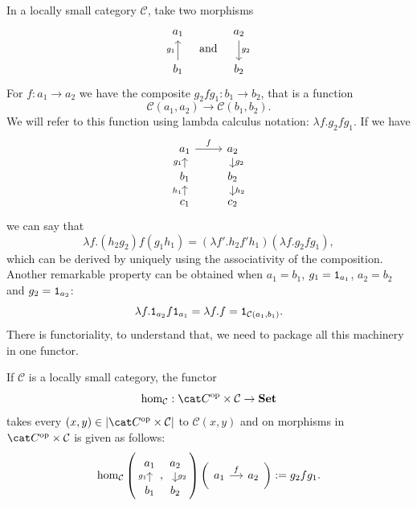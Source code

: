 In a locally small 
category \(\mathcal{C}\), take two morphisms
\[
  \begin{tikzcd}
    a_1 \\
    b_1 \ar["g_1", u]
  \end{tikzcd} \quad\text{and}\quad \begin{tikzcd}
    a_2 \ar["g_2", d] \\
    b_2
  \end{tikzcd}
\]
For \(f : a_1 \to a_2\) we have the composite
\(g_2 f g_1 : b_1 \to b_2\), that is a function
\[\mathcal{C} (a_1, a_2) \to \mathcal{C} (b_1, b_2) .\]
We will refer to this function using lambda calculus notation:
\(\lambda f . g_2 f g_1\). If we have
\[
  \begin{tikzcd}[row sep=small]
    a_1 \ar["f", r] & a_2 \ar["g_2", d] \\
    b_1 \ar["g_1", u] & b_2 \ar["h_2", d] \\
    c_1 \ar["h_1", u] & c_2
  \end{tikzcd}
\]
we can say that
\[
  \lambda f . (h_2 g_2) f (g_1 h_1) = (\lambda f' . h_2 f' h_1) (\lambda
  f . g_2 f g_1) ,\] which can be derived by uniquely using the
associativity of the composition. Another remarkable property can be
obtained when \(a_1 = b_1\), \(g_1 = \mathtt 1_{a_1}\), \(a_2 = b_2\) and
\(g_2 = \mathtt 1_{a_2}\):
\[
  \lambda f . \mathtt 1_{a_2} f \mathtt 1_{a_1} = \lambda f . f = \mathtt 1_{\mathcal{C} (a_1,
    b_1)} .
\]
There is functoriality, to understand that, we need to package all this
machinery in one functor.

\begin{definition}
  If \(\mathcal{C}\) is a locally small category, the functor
  \[
    \hom_{\mathcal{C}} : \opcat C \times \mathcal{C} \to \Set
  \]
  takes every \((x, y) \in \obj{\opcat C \times \mathcal{C}}\) to
  \(\mathcal{C} (x, y)\) and on morphisms in \(\opcat C \times \mathcal{C}\) is
  given as follows:
  \[
    \hom_{\mathcal{C}} \left(\begin{tikzcd}[row sep=small] a_1 \\ b_1
        \ar["g_1", u] \end{tikzcd}, \begin{tikzcd}[row sep=small] a_2
        \ar["g_2", d] \\ b_2 \end{tikzcd}\right)
    \left(\begin{tikzcd}[column sep=small] a_1 \ar["f", r] &
        a_2 \end{tikzcd}\right) := g_2 f g_1 .
  \]
\end{definition}

